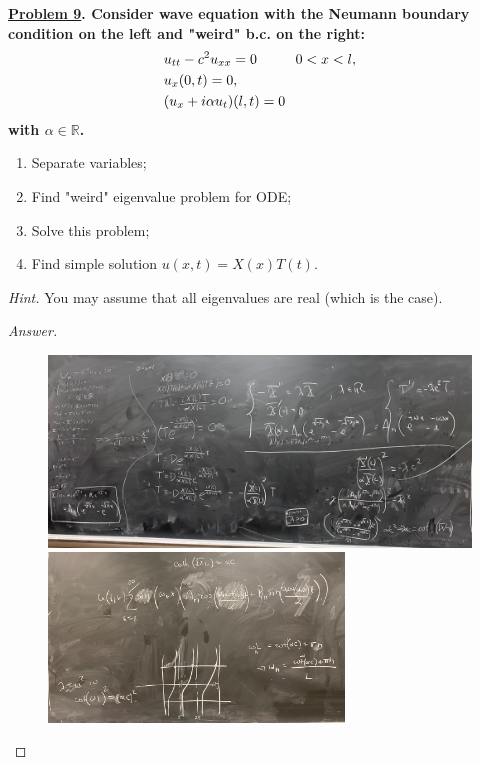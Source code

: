 \documentclass{article}
\theoremstyle{definition}
\renewcommand\qedsymbol{$\blacksquare$}
\newenvironment{ans}{\begin{proof}[Answer]\renewcommand{\qedsymbol}{}}{\end{proof}}
\newenvironment{boldenv}{\bfseries\boldmath}{}
\newcommand{\R}{\mathbb{R}}
\begin{document}
\newpage
\begin{boldenv}
    \underline{Problem 9}. Consider wave equation with the Neumann boundary condition on the left and "weird" b.c. on the right: \begin{align*}
        &u_{tt} - c^2u_{xx} = 0 \mkern 50mu 0<x<l,\\
        &u_x(0,t) = 0,\\
        &(u_x + i\alpha u_t)(l,t) = 0
    \end{align*}
    with $\alpha \in \R$. \begin{enumerate}
        \item Separate variables;
        \item Find "weird" eigenvalue problem for ODE;
        \item Solve this problem;
        \item Find simple solution $u(x,t)=X(x)T(t)$.
    \end{enumerate}
    \textit{Hint.} You may assume that all eigenvalues are real (which is the case).
\end{boldenv}
\begin{ans} \phantom{.}
    \begin{figure}[H]
        \centering
        \includegraphics[width=\textwidth]{Problem 9.jpg}
        \includegraphics[width=0.7\textwidth]{Problem 9 (2).jpg}
    \end{figure}
\end{ans}
\end{document}
